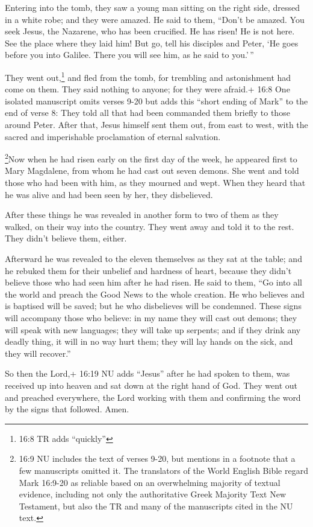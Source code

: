  Entering into the tomb, they saw a young man sitting on the
right side, dressed in a white robe; and they were amazed. 
He said to them, ``Don't be amazed. You seek Jesus, the Nazarene, who
has been crucified. He has risen! He is not here. See the place where
they laid him!  But go, tell his disciples and Peter, `He
goes before you into Galilee. There you will see him, as he said to
you.'\,''

 They went out,\footnote{16:8 TR adds ``quickly''} and fled
from the tomb, for trembling and astonishment had come on them. They
said nothing to anyone; for they were afraid.+ 16:8 One isolated
manuscript omits verses 9-20 but adds this ``short ending of Mark'' to
the end of verse 8: They told all that had been commanded them briefly
to those around Peter. After that, Jesus himself sent them out, from
east to west, with the sacred and imperishable proclamation of eternal
salvation.

 \footnote{16:9 NU includes the text of verses 9-20, but
  mentions in a footnote that a few manuscripts omitted it. The
  translators of the World English Bible regard Mark 16:9-20 as reliable
  based on an overwhelming majority of textual evidence, including not
  only the authoritative Greek Majority Text New Testament, but also the
  TR and many of the manuscripts cited in the NU text.}Now when he had
risen early on the first day of the week, he appeared first to Mary
Magdalene, from whom he had cast out seven demons.  She
went and told those who had been with him, as they mourned and wept.
 When they heard that he was alive and had been seen by
her, they disbelieved.

 After these things he was revealed in another form to two
of them as they walked, on their way into the country. 
They went away and told it to the rest. They didn't believe them,
either.

 Afterward he was revealed to the eleven themselves as they
sat at the table; and he rebuked them for their unbelief and hardness of
heart, because they didn't believe those who had seen him after he had
risen.  He said to them, ``Go into all the world and preach
the Good News to the whole creation.  He who believes and
is baptised will be saved; but he who disbelieves will be condemned.
 These signs will accompany those who believe: in my name
they will cast out demons; they will speak with new languages;
 they will take up serpents; and if they drink any deadly
thing, it will in no way hurt them; they will lay hands on the sick, and
they will recover.''

 So then the Lord,+ 16:19 NU adds ``Jesus'' after he had
spoken to them, was received up into heaven and sat down at the right
hand of God.  They went out and preached everywhere, the
Lord working with them and confirming the word by the signs that
followed. Amen.
